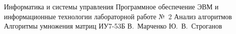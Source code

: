 \makereporttitle
    {Информатика и системы управления}
    {Программное обеспечение ЭВМ и информационные технологии}
    {лабораторной работе №~2}
    {Анализ алгоритмов}
    {Алгоритмы умножения матриц}
    {}
    {ИУ7-53Б}
    {В.~Марченко}
    {Ю.~В.~Строганов}
    {}
